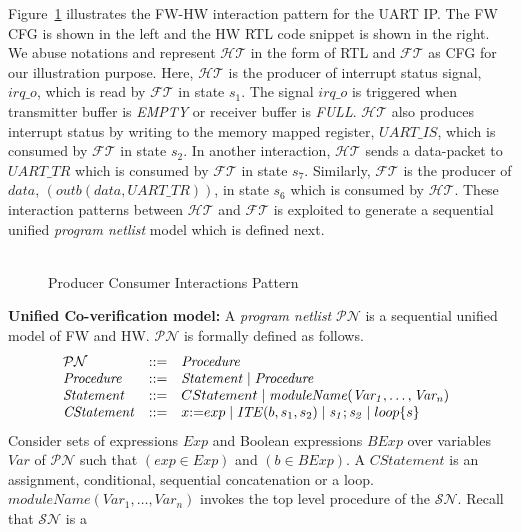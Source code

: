 \documentclass[sigconf]{acmart}
\begin{document}
Figure~\ref{fig:interleaving1} illustrates the FW-HW interaction pattern 
for the UART IP. The FW CFG is shown in the left and the 
HW RTL code snippet is shown in the right. We abuse notations and 
represent $\mathcal{HT}$ in the form of RTL and $\mathcal{FT}$ as CFG
for our illustration purpose. Here, $\mathcal{HT}$ is the producer of interrupt 
status signal, $irq\_o$, which is read by $\mathcal{FT}$ in state $s_1$. 
The signal $irq\_o$ is  triggered when transmitter buffer is 
{\em EMPTY} or receiver buffer is {\em FULL}. 
$\mathcal{HT}$ also produces interrupt status by writing to the 
memory mapped register, $UART\_IS$, which is consumed by 
$\mathcal{FT}$ in state $s_2$.  In another interaction, $\mathcal{HT}$
sends a data-packet to $UART\_TR$ which is consumed by $\mathcal{FT}$ in state $s_7$.
Similarly, $\mathcal{FT}$ is the producer of $data$, $(outb(data,UART\_TR))$, 
in state $s_6$ which is consumed by $\mathcal{HT}$. These interaction patterns 
between $\mathcal{HT}$ and $\mathcal{FT}$ is exploited to generate a 
sequential unified {\em program netlist} model which is defined next.\\ \\
%
\begin{figure}[t]
\caption{Producer Consumer Interactions Pattern
\label{fig:interleaving1}}
\end{figure}
%
{\bf Unified Co-verification model:}
A {\em program netlist} $\mathcal{PN}$ is a sequential unified
model of FW and HW. $\mathcal{PN}$ is formally defined as follows.
\[ 
\begin{array}[t]{@{}lll}
\mathcal{PN} & {:}{:}{=} & \mathit{Procedure} \\
\mathit{Procedure} & {:}{:}{=} & \mathit{Statement} \mid \mathit{Procedure} \\
\mathit{Statement} & {:}{:}{=} & CStatement \mid \mathit{moduleName(Var_1,\dots,Var_n)} \\
\mathit{CStatement} & {:}{:}{=} & x {:}{=} exp \mid \mathit{ITE}(b, s_1,s_2) \mid \mathit{s_1;s_2} \mid loop\{s\} \\ 
\end{array}
\]
Consider sets of expressions $Exp$ and Boolean expressions $BExp$ 
over variables $Var$ of $\mathcal{PN}$ such that $(exp \in Exp)$ and 
$(b \in BExp)$. A $\mathit{CStatement}$ is an assignment,
conditional, sequential concatenation or a loop.
$\mathit{moduleName(Var_1,\dots,Var_n)}$ invokes the top level 
procedure of the $\mathcal{SN}$. Recall that $\mathcal{SN}$ is a
\end{document}
